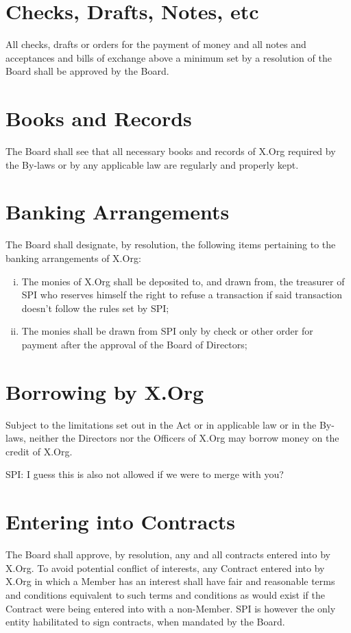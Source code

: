 \documentclass[10pt, english]{bylaws}
\begin{document}
\section{Checks, Drafts, Notes, etc}
All checks, drafts or orders for the payment of money and all notes and
acceptances
and bills of exchange above a minimum set by a resolution of the Board shall be
approved by the Board.

\section{Books and Records}
The Board shall see that all necessary books and records of X.Org required by
the By-laws or by any applicable law are regularly and properly kept.

\section{Banking Arrangements}
The Board shall designate, by resolution, the following items pertaining to the
banking arrangements of X.Org:

\begin{enumerate}[(i)\hspace{.2cm}]
	\item The monies of X.Org shall be deposited to, and drawn from, the
	treasurer of SPI who reserves himself the right to refuse a transaction
	if said transaction doesn't follow the rules set by SPI;

	\item The monies shall be drawn from SPI only by check or other order
	for payment after the approval of the Board of Directors;
\end{enumerate}

\section{Borrowing by X.Org}
Subject to the limitations set out in the Act or in applicable law or in the
By-laws, neither the Directors nor the Officers of X.Org may borrow money on the
credit of X.Org.

SPI: I guess this is also not allowed if we were to merge with you?

\section{Entering into Contracts}
\label{section_entering_contracts}
The Board shall approve, by resolution, any and all contracts entered into by
X.Org. To avoid potential conflict of interests, any Contract entered into by
X.Org in which a Member has an interest shall have fair and reasonable terms and
conditions equivalent to such terms and conditions as would exist if the
Contract were being entered into with a non-Member. SPI is however the only
entity habilitated to sign contracts, when mandated by the Board.
\end{document}
